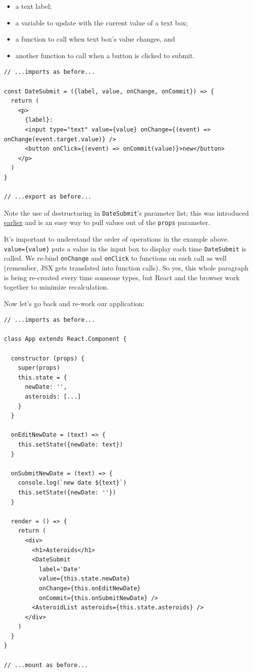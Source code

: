 \begin{itemize}
\tightlist
\item
  a text label;
\item
  a variable to update with the current value of a text box;
\item
  a function to call when text box's value changes, and
\item
  another function to call when a button is clicked to submit.
\end{itemize}

\begin{verbatim}
// ...imports as before...

const DateSubmit = ({label, value, onChange, onCommit}) => {
  return (
    <p>
      {label}:
      <input type="text" value={value} onChange={(event) => onChange(event.target.value)} />
      <button onClick={(event) => onCommit(value)}>new</button>
    </p>
  )
}

// ...export as before...
\end{verbatim}

Note the use of destructuring in \texttt{DateSubmit}'s parameter list;
this was introduced \protect\hyperlink{s:pages-citations}{earlier} and
is an easy way to pull values out of the \texttt{props} parameter.

It's important to understand the order of operations in the example
above. \texttt{value=\{value\}} puts a value in the input box to display
each time \texttt{DateSubmit} is called. We re-bind \texttt{onChange}
and \texttt{onClick} to functions on each call as well (remember, JSX
gets translated into function calls). So yes, this whole paragraph is
being re-created every time someone types, but React and the browser
work together to minimize recalculation.

Now let's go back and re-work our application:

\begin{verbatim}
// ...imports as before...

class App extends React.Component {

  constructor (props) {
    super(props)
    this.state = {
      newDate: '',
      asteroids: [...]
    }
  }

  onEditNewDate = (text) => {
    this.setState({newDate: text})
  }

  onSubmitNewDate = (text) => {
    console.log(`new date ${text}`)
    this.setState({newDate: ''})
  }

  render = () => {
    return (
      <div>
        <h1>Asteroids</h1>
        <DateSubmit
          label='Date'
          value={this.state.newDate}
          onChange={this.onEditNewDate}
          onCommit={this.onSubmitNewDate} />
        <AsteroidList asteroids={this.state.asteroids} />
      </div>
    )
  }
}

// ...mount as before...
\end{verbatim}

